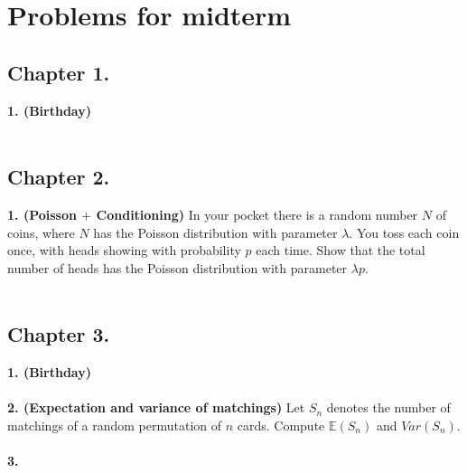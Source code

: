 \documentclass[12pt]{article}
\begin{document}
\section*{Problems for midterm}
\subsection*{Chapter 1.}
\textbf{1. (Birthday)}
\\ \\
\subsection*{Chapter 2.}
\textbf{1. (Poisson $+$ Conditioning)} In your pocket there is a random number $N$ of coins, where $N$ has the Poisson distribution with parameter $\lambda$. You toss each coin once, with heads showing with probability $p$ each time. Show that the total number of heads has the Poisson distribution with parameter $\lambda p$. \\ \\
\subsection*{Chapter 3.}
\textbf{1. (Birthday)}
\\ \\
\textbf{2. (Expectation and variance of matchings)} Let $S_n$ denotes the number of matchings of a random permutation of $n$ cards. Compute $\mathbb{E}(S_n)$ and $Var(S_n)$.
\\ \\
\textbf{3.}
\end{document}

